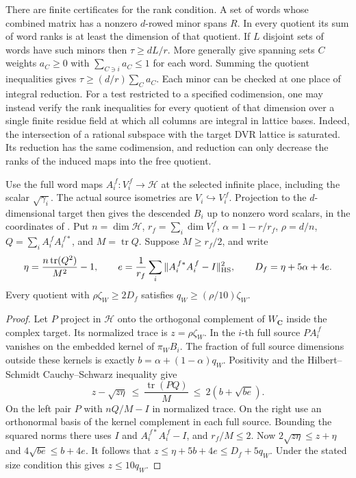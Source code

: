 There are finite certificates for the rank condition. A set of
words whose combined matrix has a nonzero \(d\)-rowed minor spans
\(R\). In every quotient its sum of word ranks is at least the
dimension of that quotient. If \(L\) disjoint sets of words have
such minors then \(\tau\ge dL/r\). More generally give spanning
sets \(C\) weights \(a_C\ge0\) with \(\sum_{C\ni i}a_C\le1\) for
each word. Summing the quotient inequalities gives
\(\tau\ge(d/r)\sum_C a_C\). Each minor can be checked at one place
of integral reduction. For a test restricted to a specified
codimension, one may instead verify the rank inequalities for every
quotient of that dimension over a single finite residue field at
which all columns are integral in lattice bases. Indeed, the
intersection of a rational subspace with the target DVR lattice
is saturated. Its reduction has the same codimension, and reduction
can only decrease the ranks of the induced maps into the free
quotient.

\begin{proposition}\label{rank:wide}
Use the full word maps \(A_i^{\,f}:V_i^{\,f}\to\mathcal H\) at the
selected infinite place, including the scalar \(\sqrt{\gamma_i}\).
The actual source isometries are \(V_i\hookrightarrow V_i^{\,f}\).
Projection to the \(d\)-dimensional target then gives the descended
\(B_i\) up to nonzero word scalars, in the coordinates of
. Put \(n=\dim\mathcal H\), \(r_f=\sum_i\dim V_i^{\,f}\),
\(\alpha=1-r/r_f\), \(\rho=d/n\), \(Q=\sum_i A_i^{\,f}A_i^{\,f*}\),
and \(M=\operatorname{tr}Q\). Suppose \(M\ge r_f/2\), and write
\[
 \eta=\frac{n\operatorname{tr}(Q^2)}{M^2}-1,\qquad
 e=\frac1{r_f}\sum_i
      \|A_i^{\,f*}A_i^{\,f}-I\|_{\rm HS}^2,\qquad
 D_f=\eta+5\alpha+4e .
\]
Every quotient with \(\rho\zeta_W\ge2D_f\) satisfies
\(q_W\ge(\rho/10)\zeta_W\).
\end{proposition}
\begin{proof}
Let \(P\) project in \(\mathcal H\) onto the orthogonal complement
of \(W_{\mathbf C}\) inside the complex target. Its normalized trace
is \(z=\rho\zeta_W\). In the \(i\)-th full source \(P A_i^{\,f}\)
vanishes on the embedded kernel of \(\pi_W B_i\). The fraction of
full source dimensions outside these kernels is exactly
\(b=\alpha+(1-\alpha)q_W\). Positivity and the Hilbert--Schmidt
Cauchy--Schwarz inequality give
\[
 z-\sqrt{z\eta}\ \le\ \frac{\operatorname{tr}(PQ)}{M}
                  \ \le\ 2(b+\sqrt{be}).
\]
On the left pair \(P\) with \(nQ/M-I\) in normalized trace.
On the right use an orthonormal basis of the kernel complement
in each full source. Bounding the squared norms there uses \(I\)
and \(A_i^{\,f*}A_i^{\,f}-I\), and \(r_f/M\le2\).
Now \(2\sqrt{z\eta}\le z+\eta\) and \(4\sqrt{be}\le b+4e\).
It follows that \(z\le\eta+5b+4e\le D_f+5q_W\). Under the stated
size condition this gives \(z\le10q_W\).
\end{proof}

